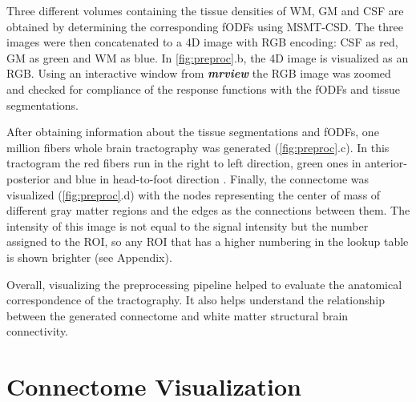 \documentclass[msthesis.tex]{subfiles}
\begin{document}

Three different volumes containing the tissue densities of \gls{WM}, \gls{GM} and \gls{CSF} are obtained by determining the corresponding \gls{fODF}s using \gls{MSMT-CSD}. The three images were then concatenated to a 4D image with \gls{RGB} encoding: \gls{CSF} as red, \gls{GM} as green and \gls{WM} as blue.  In \cref{fig:preproc}.b, the 4D image is visualized as an \gls{RGB}. Using an interactive window from \textbf{\textit{mrview}} \citep{tournier2019mrtrix3} the \gls{RGB} image was zoomed and checked for compliance of the response functions with the \gls{fODF}s and tissue segmentations.

After obtaining information about the tissue segmentations and \gls{fODF}s, one million fibers whole brain tractography was generated (\cref{fig:preproc}.c). In this tractogram the red fibers run in the right to left direction, green ones in anterior-posterior and blue in head-to-foot direction \citep{hobert2013evaluation}. Finally, the connectome was visualized (\cref{fig:preproc}.d) with the nodes representing the center of mass of different gray matter regions and the edges as the connections between them. The intensity of this image is not equal to the signal intensity but the number assigned to the ROI, so any \gls{ROI} that has a higher numbering in the lookup table is shown brighter (see Appendix). 

Overall, visualizing the preprocessing pipeline helped to evaluate the anatomical correspondence of the tractography. It also helps understand the relationship between the generated connectome and white matter structural brain connectivity.

\section{Connectome Visualization}
\end{document}

